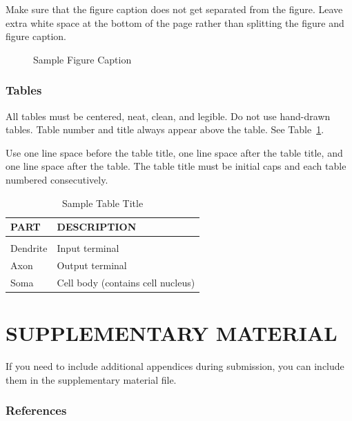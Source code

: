 \documentclass[twoside]{article} \usepackage{aistats2017}
\begin{document}
Make sure that the figure caption does not get separated from the
figure. Leave extra white space at the bottom of the page rather than
splitting the figure and figure caption.
\begin{figure}[h]
\vspace{.3in}
\centerline{}
\vspace{.3in}
\caption{Sample Figure Caption}
\end{figure}

\subsubsection{Tables}

All tables must be centered, neat, clean, and legible. Do not use hand-drawn tables. Table number and title always appear above the table.
See Table~\ref{sample-table}.

Use one line space before the table title, one line space after the table title, and one line space after the table. The table title must be
initial caps and each table numbered consecutively.

\begin{table}[h]
\caption{Sample Table Title} \label{sample-table}
\begin{center}
\begin{tabular}{ll}
{\bf PART}  &{\bf DESCRIPTION} \\
\hline \\
Dendrite         &Input terminal \\
Axon             &Output terminal \\
Soma             &Cell body (contains cell nucleus) \\
\end{tabular}
\end{center}
\end{table}

\section{SUPPLEMENTARY MATERIAL}

If you need to include additional appendices during submission, you
can include them in the supplementary material file.

\fi


\subsubsection*{References}
\vspace{-20pt} 
%


\end{document}
